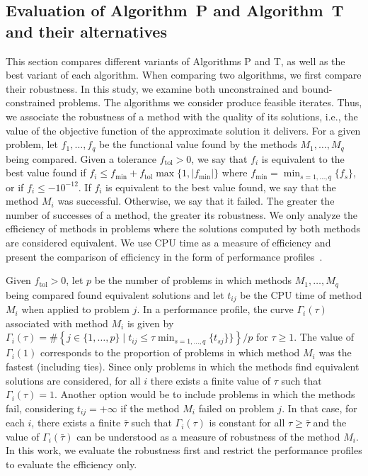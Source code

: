 \documentclass[11pt]{article}
\newcommand{\ftol}{f_{\mathrm{tol}}}
\begin{document}
\subsection{Evaluation of Algorithm~P and Algorithm~T and their alternatives} \label{sec32}

This section compares different variants of Algorithms P and T, as well as the best variant of each algorithm. When comparing two algorithms, we first compare their robustness. In this study, we examine both unconstrained and bound-constrained problems. The algorithms we consider produce feasible iterates. Thus, we associate the robustness of a method with the quality of its solutions, i.e., the value of the objective function of the approximate solution it delivers. For a given problem, let $f_1,\dots,f_q$ be the functional value found by the methods $M_1,\dots,M_q$ being compared. Given a tolerance $\ftol>0$, we say that $f_i$ is equivalent to the best value found if
$f_i \leq f_{\min} + \ftol \max\{1,|f_{\min}|\}$
where $f_{\min} = \min_{s=1,\dots,q}\{f_s\}$, or if $f_i \leq -10^{-12}$. If $f_i$ is equivalent to the best value found, we say that the method $M_i$ was successful. Otherwise, we say that it failed. The greater the number of successes of a method, the greater its robustness. We only analyze the efficiency of methods in problems where the solutions computed by both methods are considered equivalent. We use CPU time as a measure of efficiency and present the comparison of efficiency in the form of performance profiles~\cite{pp}.

Given $\ftol>0$, let $p$ be the number of problems in which methods $M_1, \dots, M_q$ being compared found equivalent solutions and let $t_{ij}$ be the CPU time of method $M_i$ when applied to problem $j$. In a performance profile, the curve $\Gamma_i(\tau)$ associated with method $M_i$ is given by
$\Gamma_i(\tau) = \# \left\{ j \in \{1,\dots,p\} \;|\; t_{ij} \leq \tau \min_{s=1,\dots,q} \{t_{sj} \}\} \right\} / p$
for $\tau \geq 1$. The value of $\Gamma_i(1)$ corresponds to the proportion of problems in which method $M_i$ was the fastest (including ties). Since only problems in which the methods find equivalent solutions are considered, for all $i$ there exists a finite value of $\tau$ such that $\Gamma_i(\tau)=1$. Another option would be to include problems in which the methods fail, considering $t_{ij}=+\infty$ if the method $M_i$ failed on problem $j$. In that case, for each $i$, there exists a finite $\bar \tau$ such that $\Gamma_i(\tau)$ is constant for all $\tau \geq \bar \tau$ and the value of $\Gamma_i(\bar \tau)$ can be understood as a measure of robustness of the method $M_i$. In this work, we evaluate the robustness first and restrict the performance profiles to evaluate the efficiency only.
\end{document}
